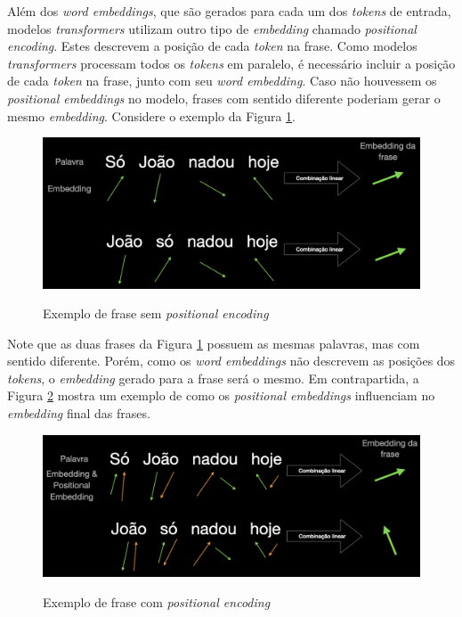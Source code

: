 Além dos \textit{word embeddings}, que são gerados para cada um dos \textit{tokens} de entrada, modelos \textit{transformers} utilizam outro tipo de \textit{embedding} chamado \textit{positional encoding}. Estes descrevem a posição de cada \textit{token} na frase. Como modelos \textit{transformers} processam todos os \textit{tokens} em paralelo, é necessário incluir a posição de cada \textit{token} na frase, junto com seu \textit{word embedding}. Caso não houvessem os \textit{positional embeddings} no modelo, frases com sentido diferente poderiam gerar o mesmo \textit{embedding}. Considere o exemplo da Figura \ref{fig:concepts:wordEmbedding}.

\begin{figure}[H]
    \centering
    \caption{Exemplo de frase sem \textit{positional encoding}}
    \includegraphics[scale=0.4]{imagens/conceitos/word_embedding.png}
    \label{fig:concepts:wordEmbedding}
\end{figure}

Note que as duas frases da Figura \ref{fig:concepts:wordEmbedding} possuem as mesmas palavras, mas com sentido diferente. Porém, como os \textit{word embeddings} não descrevem as posições dos \textit{tokens}, o \textit{embedding} gerado para a frase será o mesmo. Em contrapartida, a Figura \ref{fig:concepts:wordAndPosEmbedding} mostra um exemplo de como os \textit{positional embeddings} influenciam no \textit{embedding} final das frases.

\begin{figure}[H]
    \centering
    \caption{Exemplo de frase com \textit{positional encoding}}
    \includegraphics[scale=0.4]{imagens/conceitos/word_n_positional_embeddings.png}
    \label{fig:concepts:wordAndPosEmbedding}
\end{figure}

